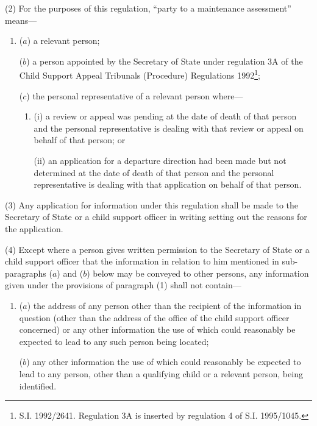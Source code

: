 \documentclass[a4paper,12pt]{article}
\begin{document}
(2) For the purposes of this regulation, “party to a maintenance assessment” means—
\begin{enumerate}\item[]
($a$) a relevant person;

($b$) a person appointed by the Secretary of State under regulation 3A of the Child Support Appeal Tribunals (Procedure) Regulations 1992\footnote{\frenchspacing S.I. 1992/2641. Regulation 3A is inserted by regulation 4 of S.I. 1995/1045.};


($c$) the personal representative of a relevant person where—
\begin{enumerate}\item[]
(i) a review or appeal was pending at the date of death of that person and the personal representative is dealing with that review or appeal on behalf of that person; or

(ii) an application for a departure direction had been made but not determined at the date of death of that person and the personal representative is dealing with that application on behalf of that person.
\end{enumerate}
\end{enumerate}

(3) Any application for information under this regulation shall be made to the Secretary of State or a child support officer in writing setting out the reasons for the application.

(4) Except where a person gives written permission to the Secretary of State or a child support officer that the information in relation to him mentioned in sub-paragraphs ($a$) and ($b$) below may be conveyed to other persons, any information given under the provisions of paragraph (1) shall not contain—
\begin{enumerate}\item[]
($a$) the address of any person other than the recipient of the information in question (other than the address of the office of the child support officer concerned) or any other information the use of which could reasonably be expected to lead to any such person being located;

($b$) any other information the use of which could reasonably be expected to lead to any person, other than a qualifying child or a relevant person, being identified.
\end{enumerate}
\end{document}
